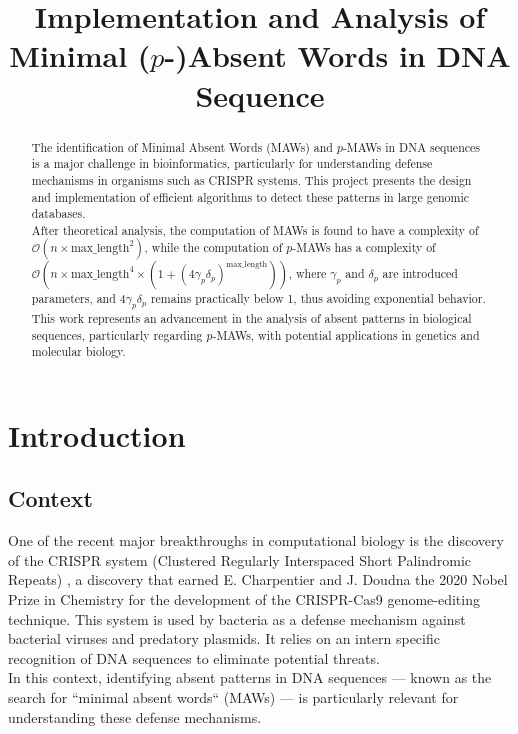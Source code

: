 \documentclass[conference]{IEEEtran}
\begin{document}
\title{Implementation and Analysis of Minimal ($p$-)Absent Words in DNA Sequence}

\author{
}

\maketitle
\begin{abstract}
The identification of Minimal Absent Words (MAWs) and $p$-MAWs in DNA sequences is a major challenge in bioinformatics, particularly for understanding defense mechanisms in organisms such as CRISPR systems. This project presents the design and implementation of efficient algorithms to detect these patterns in large genomic databases.\\
After theoretical analysis, the computation of MAWs is found to have a complexity of $\mathcal{O}(n \times \text{max\_length}^2)$, while the computation of $p$-MAWs has a complexity of $\mathcal{O}(n \times \text{max\_length}^4 \times (1 + (4\gamma_p \delta_p)^{\text{max\_length}}))$, where $\gamma_p$ and $\delta_p$ are introduced parameters, and $4\gamma_p \delta_p$ remains practically below 1, thus avoiding exponential behavior. This work represents an advancement in the analysis of absent patterns in biological sequences, particularly regarding $p$-MAWs, with potential applications in genetics and molecular biology.
\end{abstract}

\section{Introduction}
\subsection{Context}
One of the recent major breakthroughs in computational biology is the discovery of the CRISPR system (Clustered Regularly Interspaced Short Palindromic Repeats) \cite{b1}, a discovery that earned E. Charpentier and J. Doudna the 2020 Nobel Prize in Chemistry for the development of the CRISPR-Cas9 genome-editing technique. This system is used by bacteria as a defense mechanism against bacterial viruses and predatory plasmids. It relies on an intern specific recognition of DNA sequences to eliminate potential threats.\\
In this context, identifying absent patterns in DNA sequences — known as the search for ``minimal absent words`` (MAWs) — is particularly relevant for understanding these defense mechanisms.
\end{document}
